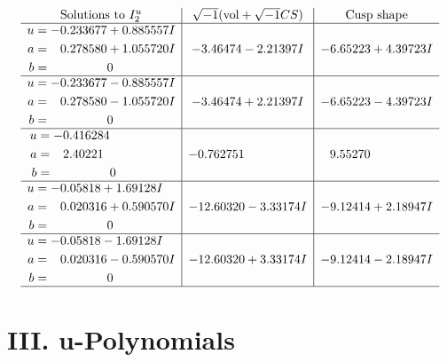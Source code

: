 \documentclass[1p]{elsarticle_modified}
\theoremstyle{definition}
\newcommand{\I}{\sqrt{-1}}
\begin{document}
$$\begin{array}{c|c|c}  
\text{Solutions to }I^u_{2}& \I (\text{vol} + \sqrt{-1}CS) & \text{Cusp shape}\\
 \hline 
\begin{aligned}
u &= -0.233677 + 0.885557 I \\
a &= \phantom{-}0.278580 + 1.055720 I \\
b &= \phantom{-0.000000 } 0\end{aligned}
 & -3.46474 - 2.21397 I & -6.65223 + 4.39723 I \\ \hline\begin{aligned}
u &= -0.233677 - 0.885557 I \\
a &= \phantom{-}0.278580 - 1.055720 I \\
b &= \phantom{-0.000000 } 0\end{aligned}
 & -3.46474 + 2.21397 I & -6.65223 - 4.39723 I \\ \hline\begin{aligned}
u &= -0.416284\phantom{ +0.000000I} \\
a &= \phantom{-}2.40221\phantom{ +0.000000I} \\
b &= \phantom{-0.000000 } 0\end{aligned}
 & -0.762751\phantom{ +0.000000I} & \phantom{-}9.55270\phantom{ +0.000000I} \\ \hline\begin{aligned}
u &= -0.05818 + 1.69128 I \\
a &= \phantom{-}0.020316 + 0.590570 I \\
b &= \phantom{-0.000000 } 0\end{aligned}
 & -12.60320 - 3.33174 I & -9.12414 + 2.18947 I \\ \hline\begin{aligned}
u &= -0.05818 - 1.69128 I \\
a &= \phantom{-}0.020316 - 0.590570 I \\
b &= \phantom{-0.000000 } 0\end{aligned}
 & -12.60320 + 3.33174 I & -9.12414 - 2.18947 I\\
 \hline 
 \end{array}$$\newpage
\newpage\renewcommand{\arraystretch}{1}
\centering \section*{ III. u-Polynomials}
\end{document}
